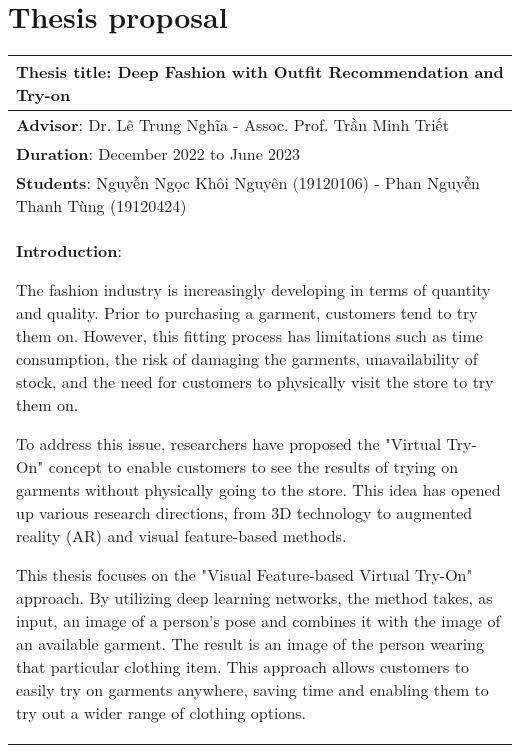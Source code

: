 \chapter{Thesis proposal}


\begin{longtable}{|p{{{80mm}}}|c|}
\hline
\multicolumn{2}{|m{\linewidth}|}{\textbf{Thesis title}: Deep Fashion with Outfit Recommendation and Try-on}\\
\hline
\multicolumn{2}{|m{\linewidth}|}{\textbf{Advisor}: Dr. Lê Trung Nghĩa - Assoc. Prof. Trần Minh Triết} \\
\hline
\multicolumn{2}{|m{\linewidth}|}{\textbf{Duration}: December 2022 to June 2023}\\
\hline
\multicolumn{2}{|m{\linewidth}|}{
\textbf{Students}: Nguyễn Ngọc Khôi Nguyên (19120106) - Phan Nguyễn Thanh Tùng (19120424)} \\
\hline

\multicolumn{2}{|m{\linewidth}|}{\textbf{Introduction}:\par
The fashion industry is increasingly developing in terms of quantity and quality. Prior to purchasing a garment, customers tend to try them on. However, this fitting process has limitations such as time consumption, the risk of damaging the garments, unavailability of stock, and the need for customers to physically visit the store to try them on.\par

To address this issue, researchers have proposed the "Virtual Try-On" concept to enable customers to see the results of trying on garments without physically going to the store. This idea has opened up various research directions, from 3D technology to augmented reality (AR) and visual feature-based methods.\par

This thesis focuses on the "Visual Feature-based Virtual Try-On" approach. By utilizing deep learning networks, the method takes, as input, an image of a person's pose and combines it with the image of an available garment. The result is an image of the person wearing that particular clothing item. This approach allows customers to easily try on garments anywhere, saving time and enabling them to try out a wider range of clothing options.
}\\
\hline


\end{longtable}
